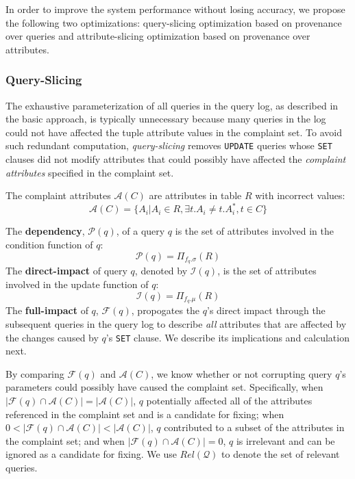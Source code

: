 In order to improve the system performance without losing accuracy, we propose
the following two optimizations: query-slicing optimization 
based on provenance over queries and
attribute-slicing optimization based on provenance over 
attributes. 
\fi

\subsubsection{Query-Slicing}
\label{sec:opt:query}
The exhaustive parameterization of all queries in the query log, as described
in the basic approach, is typically unnecessary because many queries in the log
could not have affected the tuple attribute values in the complaint set.
To avoid such redundant computation, \textit{query-slicing} 
removes \texttt{UPDATE} queries whose \texttt{SET} clauses did not modify 
attributes that could possibly have affected the {\it complaint attributes} 
specified in the complaint set.


\begin{definition} 
	The complaint attributes $\mathcal{A}(C)$ are attributes in 
	table $R$ with incorrect values: 
	\[\mathcal{A}(C) = \{A_i|A_i\in R, \exists t.A_i \neq t.A_i^*, t\in C\}\]
\end{definition} 

\begin{definition}
    The \textbf{dependency}, $\mathcal{P}(q)$, of a query $q$
    is the set of 
    attributes involved in the condition function of $q$:
    \[\mathcal{P}(q) = \Pi_{f_{q}.\sigma}(R)\]
    The \textbf{direct-impact} of query $q$, denoted
    by $\mathcal{I}(q)$, is the set of attributes 
    involved in the update function of $q$:
    \[\mathcal{I}(q) = \Pi_{f_{q}.\mu}(R)\]
    The \textbf{full-impact}
    of $q$, $\mathcal{F}(q)$, propogates the $q$'s direct impact through
    the subsequent queries in the query log to describe {\it all} attributes
    that are affected by the changes caused by $q$'s \texttt{SET} clause.
    We describe its implications and calculation next.
\end{definition}


By comparing $\mathcal{F}(q)$ and $\mathcal{A}(C)$, we know whether
or not corrupting query $q$'s parameters could possibly have caused the complaint
set.  Specifically, when $|\mathcal{F}(q) \cap \mathcal{A}(C)|=|\mathcal{A}(C)|$, 
$q$ potentially affected all of the attributes referenced in the complaint set and is
a candidate for fixing; 
when $0 < |\mathcal{F}(q) \cap \mathcal{A}(C)|< |\mathcal{A}(C)|$, 
$q$ contributed to a subset of the attributes in the complaint set; 
and when $|\mathcal{F}(q) \cap \mathcal{A}(C)|=0$, $q$ is irrelevant 
and can be ignored as a candidate for fixing. 
We use $Rel\mathcal{(Q)}$ to denote the set of relevant queries. 

